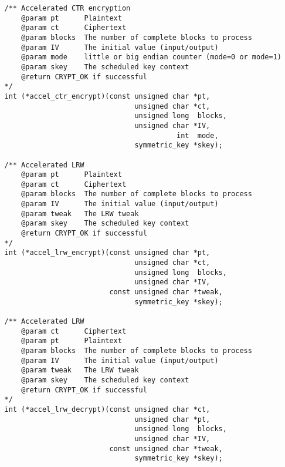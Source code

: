 \documentclass[synpaper]{book}
\begin{document}
\begin{small}
\begin{verbatim}
   /** Accelerated CTR encryption 
       @param pt      Plaintext
       @param ct      Ciphertext
       @param blocks  The number of complete blocks to process
       @param IV      The initial value (input/output)
       @param mode    little or big endian counter (mode=0 or mode=1)
       @param skey    The scheduled key context
       @return CRYPT_OK if successful
   */
   int (*accel_ctr_encrypt)(const unsigned char *pt, 
                                  unsigned char *ct, 
                                  unsigned long  blocks, 
                                  unsigned char *IV, 
                                            int  mode, 
                                  symmetric_key *skey);

   /** Accelerated LRW 
       @param pt      Plaintext
       @param ct      Ciphertext
       @param blocks  The number of complete blocks to process
       @param IV      The initial value (input/output)
       @param tweak   The LRW tweak
       @param skey    The scheduled key context
       @return CRYPT_OK if successful
   */
   int (*accel_lrw_encrypt)(const unsigned char *pt, 
                                  unsigned char *ct, 
                                  unsigned long  blocks, 
                                  unsigned char *IV, 
                            const unsigned char *tweak, 
                                  symmetric_key *skey);

   /** Accelerated LRW 
       @param ct      Ciphertext
       @param pt      Plaintext
       @param blocks  The number of complete blocks to process
       @param IV      The initial value (input/output)
       @param tweak   The LRW tweak
       @param skey    The scheduled key context
       @return CRYPT_OK if successful
   */
   int (*accel_lrw_decrypt)(const unsigned char *ct, 
                                  unsigned char *pt, 
                                  unsigned long  blocks, 
                                  unsigned char *IV, 
                            const unsigned char *tweak, 
                                  symmetric_key *skey);


\end{verbatim}
\end{small}
\end{document}
